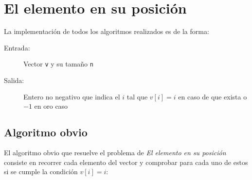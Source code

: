 \section{El elemento en su posición}

La implementación de todos los algoritmos realizados es de la forma:
\begin{description}
 \item[Entrada:] Vector \texttt{v} y su tamaño \texttt{n}
 \item[Salida:] Entero no negativo que indica el $i$ tal que $v[i]=i$ en caso de que exista o $-1$ en oro caso
\end{description}

\subsection{Algoritmo obvio}

El algoritmo obvio que resuelve el problema de \textit{El elemento en su posición} consiste
en recorrer cada elemento del vector y comprobar para cada uno de estos si se cumple la
condición $v[i] = i$:


